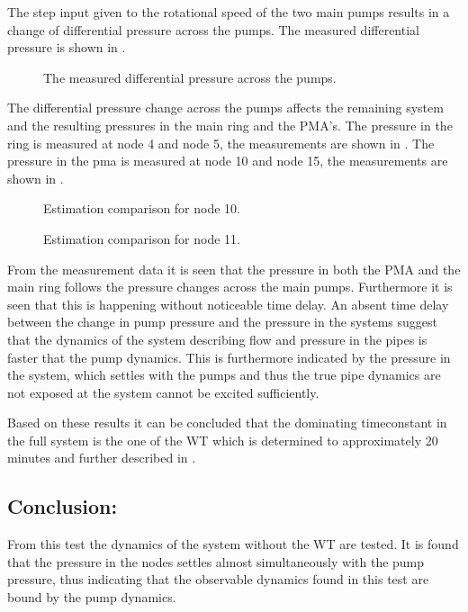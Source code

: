 The step input given to the rotational speed of the two main pumps results in a change of differential pressure across the pumps. The measured differential pressure is shown in . 

\begin{figure}[H]

\caption{The measured differential pressure across the pumps.}
\label{fig:Test_pipe_pumpdiff}
\end{figure}

The differential pressure change across the pumps affects the remaining system and the resulting pressures in the main ring and the PMA's.
The pressure in the ring is measured at node 4 and node 5, the measurements are shown in . 
The pressure in the pma is measured at node 10 and node 15, the measurements are shown in .   

\begin{figure}[H]
  \centering
  \begin{minipage}[b]{0.45\textwidth}
	
    \caption{Estimation comparison for node 10.}
    \label{fig:Test_pipe_ring}
  \end{minipage}
  \hfill
  \begin{minipage}[b]{0.45\textwidth}
    
    \caption{Estimation comparison for node 11.}
    \label{fig:Test_pipe_pma}
  \end{minipage}
\end{figure}

From the measurement data it is seen that the pressure in both the PMA and the main ring follows the pressure changes across the main pumps. Furthermore it is seen that this is happening without noticeable time delay. An absent time delay between the change in pump pressure and the pressure in the systems suggest that the dynamics of the system describing flow and pressure in the pipes is faster that the pump dynamics. This is furthermore indicated by the pressure in the system, which settles with the pumps and thus the true pipe dynamics are not exposed at the system cannot be excited sufficiently.

Based on these results it can be concluded that the dominating timeconstant in the full system is the one of the WT which is determined to approximately 20 minutes and further described in .       

\subsection*{Conclusion:}
From this test the dynamics of the system without the WT are tested. It is found that the pressure in the nodes settles almost simultaneously with the pump pressure, thus indicating that the observable dynamics found in this test are bound by the pump dynamics.   